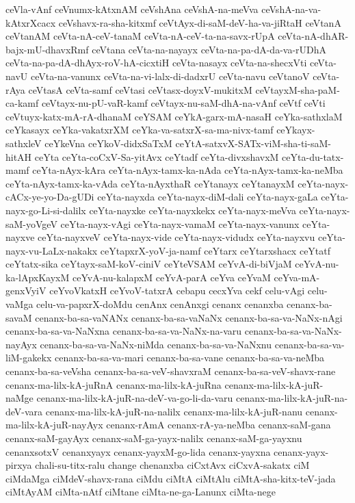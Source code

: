 {ceVla-vAnf
ceVnumx-kAtxnAM
ceVshAna
ceVshA-na-meVva
ceVshA-na-va-kAtxrXcacx
ceVshavx-ra-sha-kitxmf
ceVtAyx-di-saM-deV-ha-va-jiRtaH
ceVtanA
ceVtanAM
ceVta-nA-ceV-tanaM
ceVta-nA-ceV-ta-na-savx-rUpA
ceVta-nA-dhAR-bajx-mU-dhavxRmf
ceVtana
ceVta-na-nayayx
ceVta-na-pa-dA-da-va-rUDhA
ceVta-na-pa-dA-dhAyx-roV-hA-cicxtiH
ceVta-nasayx
ceVta-na-shecxVti
ceVta-navU
ceVta-na-vanunx
ceVta-na-vi-lalx-di-dadxrU
ceVta-navu
ceVtanoV
ceVta-rAya
ceVtasA
ceVta-samf
ceVtasi
ceVtasx-doyxV-mukitxM
ceVtayxM-sha-paM-ca-kamf
ceVtayx-nu-pU-vaR-kamf
ceVtayx-nu-saM-dhA-na-vAnf
ceVtf
ceVti
ceVtuyx-katx-mA-rA-dhanaM
ceYSAM
ceYkA-garx-mA-nasaH
ceYka-sathxlaM
ceYkasayx
ceYka-vakatxrXM
ceYka-va-satxrX-sa-ma-nivx-tamf
ceYkayx-sathxleV
ceYkeVna
ceYkoV-didxSaTxM
ceYtA-satxvX-SATx-viM-sha-ti-saM-hitAH
ceYta
ceYta-coCxV-Sa-yitAvx
ceYtadf
ceYta-divxshavxM
ceYta-du-tatx-mamf
ceYta-nAyx-kAra
ceYta-nAyx-tamx-ka-nAda
ceYta-nAyx-tamx-ka-neMba
ceYta-nAyx-tamx-ka-vAda
ceYta-nAyxthaR
ceYtanayx
ceYtanayxM
ceYta-nayx-cACx-ye-yo-Da-gUDi
ceYta-nayxda
ceYta-nayx-diM-dali
ceYta-nayx-gaLa
ceYta-nayx-go-Li-si-dalilx
ceYta-nayxke
ceYta-nayxkekx
ceYta-nayx-meVva
ceYta-nayx-saM-yoVgeV
ceYta-nayx-vAgi
ceYta-nayx-vamaM
ceYta-nayx-vanunx
ceYta-nayxve
ceYta-nayxveV
ceYta-nayx-vide
ceYta-nayx-vidudx
ceYta-nayxvu
ceYta-nayx-vu-LaLx-nakakx
ceYtapxrX-yoV-ja-namf
ceYtarx
ceYtarxshacx
ceYtatf
ceYtatx-sika
ceYtayx-saM-koV-ciniV
ceYteVSAM
ceYvA-di-biVjaM
ceYvA-nu-ka-lApxKayxM
ceYvA-nu-kalapxM
ceYvA-parA
ceYva
ceYvaM
ceYva-mA-genxVyiV
ceYvoVkatxH
ceYvoV-tatxrA
cebapu
cecxYva
cekf
celu-vAgi
celu-vaMga
celu-va-papxrX-doMdu
cenAnx
cenAnxgi
cenanx
cenanxba
cenanx-ba-savaM
cenanx-ba-sa-vaNANx
cenanx-ba-sa-vaNaNx
cenanx-ba-sa-va-NaNx-nAgi
cenanx-ba-sa-va-NaNxna
cenanx-ba-sa-va-NaNx-na-varu
cenanx-ba-sa-va-NaNx-nayAyx
cenanx-ba-sa-va-NaNx-niMda
cenanx-ba-sa-va-NaNxnu
cenanx-ba-sa-va-liM-gakekx
cenanx-ba-sa-va-mari
cenanx-ba-sa-vane
cenanx-ba-sa-va-neMba
cenanx-ba-sa-veVsha
cenanx-ba-sa-veV-shavxraM
cenanx-ba-sa-veV-shavx-rane
cenanx-ma-lilx-kA-juRnA
cenanx-ma-lilx-kA-juRna
cenanx-ma-lilx-kA-juR-naMge
cenanx-ma-lilx-kA-juR-na-deV-va-go-li-da-varu
cenanx-ma-lilx-kA-juR-na-deV-vara
cenanx-ma-lilx-kA-juR-na-nalilx
cenanx-ma-lilx-kA-juR-nanu
cenanx-ma-lilx-kA-juR-nayAyx
cenanx-rAmA
cenanx-rA-ya-neMba
cenanx-saM-gana
cenanx-saM-gayAyx
cenanx-saM-ga-yayx-nalilx
cenanx-saM-ga-yayxnu
cenanxsotxV
cenanxyayx
cenanx-yayxM-go-lida
cenanx-yayxna
cenanx-yayx-pirxya
chali-su-titx-ralu
change
chenanxba
ciCxtAvx
ciCxvA-sakatx
ciM
ciMdaMga
ciMdeV-shavx-rana
ciMdu
ciMtA
ciMtAlu
ciMtA-sha-kitx-teV-jada
ciMtAyAM
ciMta-nAtf
ciMtane
ciMta-ne-ga-Lanunx
ciMta-nege
}
